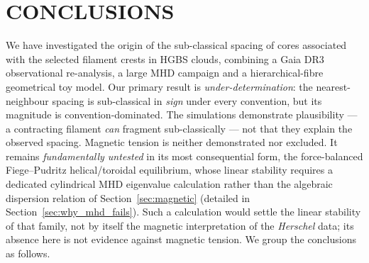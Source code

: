 \documentclass[usenatbib,twoside,twocolumn]{mnras}
\begin{document}
\section{CONCLUSIONS}

We have investigated the origin of the sub-classical spacing of cores associated with the selected filament crests in HGBS clouds, combining a Gaia DR3 observational re-analysis, a large MHD campaign and a hierarchical-fibre geometrical toy model. Our primary result is \emph{under-determination}: the nearest-neighbour spacing is sub-classical in \emph{sign} under every convention, but its magnitude is convention-dominated. The simulations demonstrate plausibility --- a contracting filament \emph{can} fragment sub-classically --- not that they explain the observed spacing. Magnetic tension is neither demonstrated nor excluded. It remains \emph{fundamentally untested} in its most consequential form, the force-balanced Fiege--Pudritz helical/toroidal equilibrium, whose linear stability requires a dedicated cylindrical MHD eigenvalue calculation rather than the algebraic dispersion relation of Section~\ref{sec:magnetic} (detailed in Section~\ref{sec:why_mhd_fails}). Such a calculation would settle the linear stability of that family, not by itself the magnetic interpretation of the \textit{Herschel} data; its absence here is not evidence against magnetic tension. We group the conclusions as follows.
\end{document}
